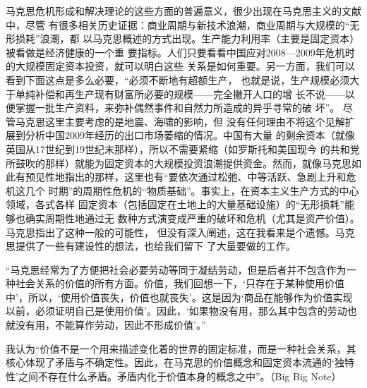 马克思危机形成和解决理论的这些方面的普遍意义，很少出现在马克思主义的文献中，尽管
有很多相关历史证据：商业周期与新技术浪潮，商业周期与大规模的“无形损耗”浪潮，都
以马克思概述的方式出现。生产能力利用率（主要是固定资本）被看做是经济健康的一个重
要指标。人们只要看看中国应对2008—2009年危机时的大规模固定资本投资，就可以明白这些
关系是如何重要。另一方面，我们可以看到下面这点是多么必要，“必须不断地有超额生产，
也就是说，生产规模必须大于单纯补偿和再生产现有财富所必要的规模——完全撇开人口的增
长不说——以便掌握一批生产资料，来弥补偶然事件和自然力所造成的异乎寻常的破
坏”。 尽管马克思这里主要考虑的是地震、海啸的影响，但
没有任何理由不将这个见解扩展到分析中国2009年经历的出口市场萎缩的情况。中国有大量
的剩余资本（就像英国从17世纪到19世纪末那样），所以不需要紧缩（如罗斯托和美国现今
的共和党所鼓吹的那样）就能为固定资本的大规模投资浪潮提供资金。然而，就像马克思如
此有预见性地指出的那样，这里也有“要依次通过松弛、中等活跃、急剧上升和危机这几个
时期”的周期性危机的“物质基础”。事实上，在资本主义生产方式的中心领域，各式各样
固定资本（包括固定在土地上的大量基础设施）的“无形损耗”能够也确实周期性地通过无
数种方式演变成严重的破坏和危机（尤其是资产价值）。马克思指出了这种一般的可能性，
但没有深入阐述，这在我看来是个遗憾。马克思提供了一些有建设性的想法，也给我们留下
了大量要做的工作。

“马克思经常为了方便把社会必要劳动等同于凝结劳动，但是后者并不包含作为一种社会关系的价值的所有方面。价值，我们回想一下，‘只存在于某种使用价值中’，所以，‘使用价值丧失，价值也就丧失’。这是因为‘商品在能够作为价值实现以前，必须证明自己是使用价值’。因此，‘如果物没有用，那么其中包含的劳动也就没有用，不能算作劳动，因此不形成价值’。”

我认为“价值不是一个用来描述变化着的世界的固定标准，而是一种社会关系，其核心体现了矛盾与不确定性。因此，在马克思的价值概念和固定资本流通的‘独特性’之间不存在什么矛盾。矛盾内化于价值本身的概念之中”。（Big Big Note）















